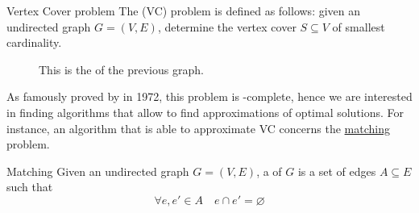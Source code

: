 \documentclass[a4paper, 12pt]{report}
\begin{document}
    \begin{frameddefn}{Vertex Cover problem}
        The  (VC) problem is defined as follows: given an undirected graph $G = (V, E)$, determine the vertex cover $S \subseteq V$ of smallest cardinality.
    \end{frameddefn}

    \begin{figure}[H]
        \centering
        \caption{This is the  of the previous graph.}
    \end{figure}

    As famously proved by \textcite{karp} in 1972, this problem is \NPclass-complete, hence we are interested in finding algorithms that allow to find approximations of optimal solutions. For instance, an algorithm that is able to approximate VC concerns the \href{https://en.wikipedia.org/wiki/Matching_(graph_theory)}{matching} problem.

    \begin{frameddefn}{Matching}
        Given an undirected graph $G = (V, E)$, a  of $G$ is a set of edges $A \subseteq E$ such that $$\forall e, e' \in A \quad e \cap e' = \varnothing$$
    \end{frameddefn}
\end{document}
